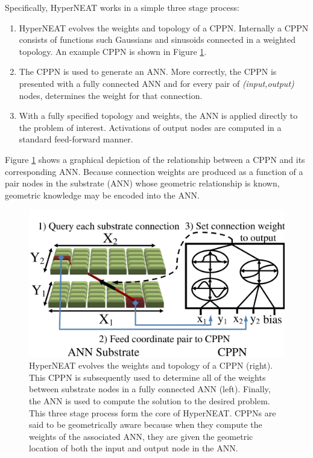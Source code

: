 \documentclass{acm_proc_article-sp}
\begin{document}
Specifically, HyperNEAT works in a simple three stage process:

\begin{enumerate}
\item HyperNEAT evolves the weights and topology of a CPPN. Internally a CPPN consists of functions such Gaussians and sinusoids connected in a weighted topology. An example CPPN is shown in Figure \ref{fig:cppn}.
\item The CPPN is used to generate an ANN. More correctly, the CPPN is presented with a fully connected ANN and for every pair of \emph{(input,output)} nodes, determines the weight for that connection.
\item With a fully specified topology and weights, the ANN is applied directly to the problem of interest. Activations of output nodes are computed in a standard feed-forward manner.
\end{enumerate}

Figure \ref{fig:cppn} shows a graphical depiction of the relationship between a CPPN and its corresponding ANN. Because connection weights are produced as a function of a pair nodes in the substrate (ANN) whose geometric relationship is known, geometric knowledge may be encoded into the ANN. 

\begin{figure}[htp]
\begin{center}
\includegraphics[width=\columnwidth]{figures/cppn}
\end{center}
\caption{HyperNEAT evolves the weights and topology of a CPPN (right). This CPPN is subsequently used to determine all of the weights between substrate nodes in a fully connected ANN (left). Finally, the ANN is used to compute the solution to the desired problem. This three stage process form the core of HyperNEAT. CPPNs are said to be geometrically aware because when they compute the weights of the associated ANN, they are given the geometric location of both the input and output node in the ANN.}
\label{fig:cppn}
\end{figure}
\end{document}
